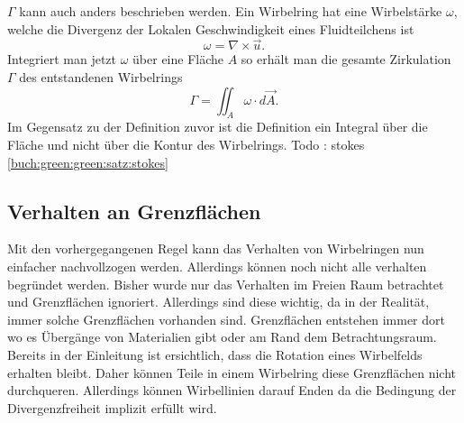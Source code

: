\(\Gamma\) kann auch anders beschrieben werden. 
Ein Wirbelring hat eine Wirbelstärke $\omega$, welche die Divergenz der Lokalen Geschwindigkeit eines Fluidteilchens ist
\[
\omega
=
\nabla \times \vec{u}.
\]
Integriert man jetzt $\omega$ über eine Fläche $A$ so erhält man die gesamte Zirkulation $\Gamma$ des entstandenen Wirbelrings
\[
\Gamma
=
\iint_{A} \omega\cdot d \vec{A}.
\]
Im Gegensatz zu der Definition zuvor ist die Definition ein Integral über die Fläche und nicht über die Kontur des Wirbelrings. 
Todo : stokes \ref{buch:green:green:satz:stokes}

\subsection{Verhalten an Grenzflächen \label{paper:Wirbelringe:Grenzflaechen}}

Mit den vorhergegangenen Regel kann das Verhalten von Wirbelringen nun einfacher nachvollzogen werden. 
Allerdings können noch nicht alle verhalten begründet werden. 
Bisher wurde nur das Verhalten im Freien Raum betrachtet und Grenzflächen ignoriert. 
Allerdings sind diese wichtig, da in der Realität, immer solche Grenzflächen vorhanden sind. 
Grenzflächen entstehen immer dort wo es Übergänge von Materialien gibt oder am Rand dem Betrachtungsraum.
Bereits in der Einleitung ist ersichtlich, dass die Rotation eines Wirbelfelds erhalten bleibt. 
Daher können Teile in einem Wirbelring diese Grenzflächen nicht durchqueren. 
Allerdings können Wirbellinien darauf Enden da die Bedingung der Divergenzfreiheit implizit erfüllt wird. 
